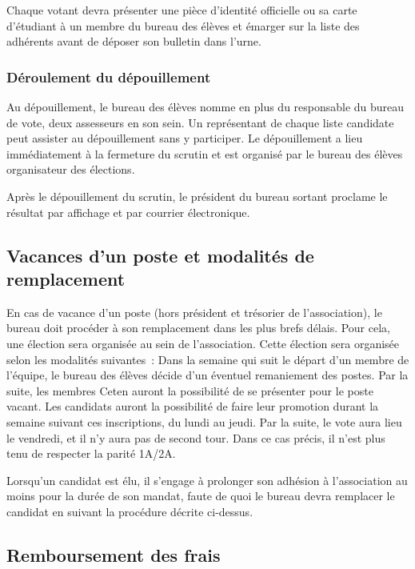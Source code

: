 \documentclass{article} %
\begin{document}
				Chaque votant devra présenter une pièce d’identité officielle ou
				sa carte d’étudiant à un membre du bureau des élèves et émarger
				sur la liste des adhérents avant de déposer son bulletin dans
				l’urne.

			\subsubsection{Déroulement du dépouillement}
\label{ssub:deroulement_du_depouillement}

				Au dépouillement, le bureau des élèves nomme en plus du
				responsable du bureau de vote, deux assesseurs en son sein. Un
				représentant de chaque liste candidate peut assister au
				dépouillement sans y participer. Le dépouillement a lieu
				immédiatement à la fermeture du scrutin et est organisé par le
				bureau des élèves organisateur des élections.

				Après le dépouillement du scrutin, le président du bureau
				sortant proclame le résultat par affichage et par courrier
				électronique.

		\subsection{Vacances d'un poste et modalités de remplacement}
\label{sub:vacances_d_un_poste_et_modalites_de_remplacement}

			En cas de vacance d'un poste (hors président et trésorier de
			l’association), le bureau doit procéder à son remplacement dans les
			plus brefs délais. Pour cela, une élection sera organisée au sein de
			l'association. Cette élection sera organisée selon les modalités
			suivantes : Dans la semaine qui suit le départ d’un membre de
			l’équipe, le bureau des élèves décide d’un éventuel remaniement des
			postes. Par la suite, les membres Ceten auront la possibilité de se
			présenter pour le poste vacant. Les candidats auront la possibilité
			de faire leur promotion durant la semaine suivant ces inscriptions,
			du lundi au jeudi. Par la suite, le vote aura lieu le vendredi, et
			il n’y aura pas de second tour. Dans ce cas précis, il n’est plus
			tenu de respecter la parité 1A/2A.
			
			Lorsqu’un candidat est élu, il s’engage à prolonger son adhésion
			à l’association au moins pour la durée de son mandat, faute de
			quoi le bureau devra remplacer le candidat en suivant
			la procédure décrite ci-dessus.

		\subsection{Remboursement des frais}
\label{sub:remboursement_des_frais}
\end{document}
